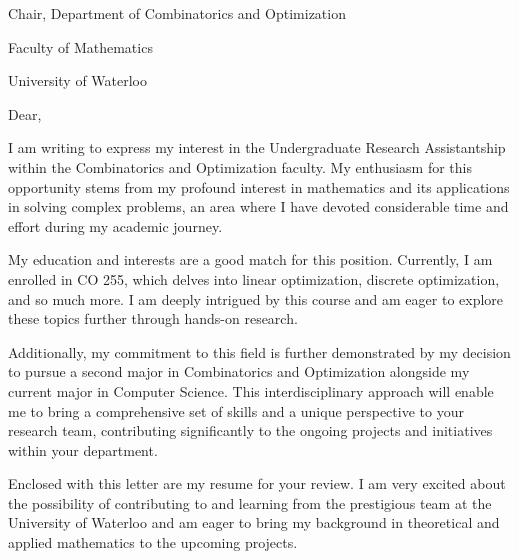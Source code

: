 \documentclass[letterpaper,11pt]{article}
\begin{document}

\qquad Chair, Department of Combinatorics and Optimization 

Faculty of Mathematics 

University of Waterloo
\newline

Dear,
\newline

I am writing to express my interest in the Undergraduate Research Assistantship within the Combinatorics and Optimization faculty. My enthusiasm for this opportunity stems from my profound interest in mathematics and its applications in solving complex problems, an area where I have devoted considerable time and effort during my academic journey.
\newline

My education and interests are a good match for this position. Currently, I am enrolled in CO 255, which delves into linear optimization, discrete optimization, and so much more. I am deeply intrigued by this course and am eager to explore these topics further through hands-on research. 
\newline

Additionally, my commitment to this field is further demonstrated by my decision to pursue a second major in Combinatorics and Optimization alongside my current major in Computer Science. This interdisciplinary approach will enable me to bring a comprehensive set of skills and a unique perspective to your research team, contributing significantly to the ongoing projects and initiatives within your department.
\newline

Enclosed with this letter are my resume for your review. I am very excited about the possibility of contributing to and learning from the prestigious team at the University of Waterloo and am eager to bring my background in theoretical and applied mathematics to the upcoming projects.
\newline
\end{document}
